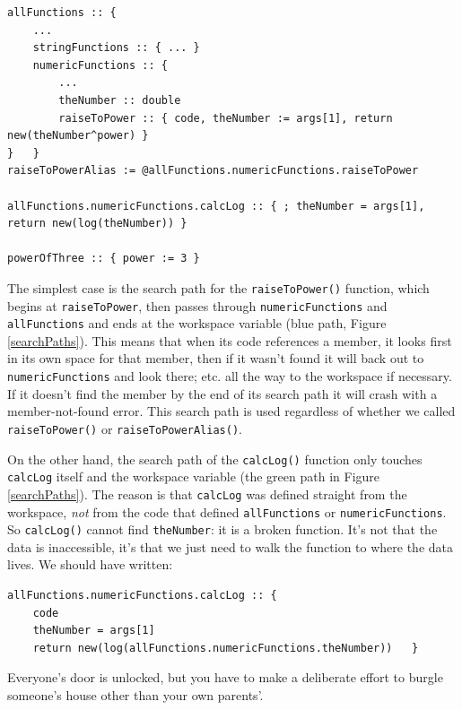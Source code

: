 \documentclass{article}
\newenvironment{code}{
       \begin{list}{}{
               \setlength{\leftmargin}{.4in}
               \setlength{\rightmargin}{0in}
               \setlength{\topsep}{.2in}
       }
       \small
       \item[] }
       { \end{list}   }
\begin{document}
\begin{code} \begin{verbatim}
allFunctions :: {
    ...
    stringFunctions :: { ... }
    numericFunctions :: {
        ...
        theNumber :: double
        raiseToPower :: { code, theNumber := args[1], return new(theNumber^power) }
}   }
raiseToPowerAlias := @allFunctions.numericFunctions.raiseToPower

allFunctions.numericFunctions.calcLog :: { ; theNumber = args[1], return new(log(theNumber)) }

powerOfThree :: { power := 3 }
\end{verbatim} \end{code}

\noindent The simplest case is the search path for the \verb#raiseToPower()# function, which begins at \verb#raiseToPower#, then passes through \verb#numericFunctions# and \verb#allFunctions# and ends at the workspace variable (blue path, Figure \ref{searchPaths}).  This means that when its code references a member, it looks first in its own space for that member, then if it wasn't found it will back out to \verb#numericFunctions# and look there; etc. all the way to the workspace if necessary.  If it doesn't find the member by the end of its search path it will crash with a member-not-found error.  This search path is used regardless of whether we called \verb#raiseToPower()# or \verb#raiseToPowerAlias()#.

On the other hand, the search path of the \verb#calcLog()# function only touches \verb#calcLog# itself and the workspace variable (the green path in Figure \ref{searchPaths}).  The reason is that \verb#calcLog# was defined straight from the workspace, \emph{not} from the code that defined \verb#allFunctions# or \verb#numericFunctions#.  So \verb#calcLog()# cannot find \verb#theNumber#:  it is a broken function.  It's not that the data is inaccessible, it's that we just need to walk the function to where the data lives.  We should have written:

\begin{code} \begin{verbatim}
allFunctions.numericFunctions.calcLog :: {
    code
    theNumber = args[1]
    return new(log(allFunctions.numericFunctions.theNumber))   }
\end{verbatim} \end{code}

\noindent Everyone's door is unlocked, but you have to make a deliberate effort to burgle someone's house other than your own parents'.
\end{document}
